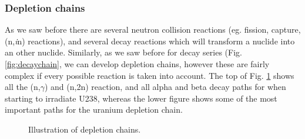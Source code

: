 \subsubsection{Depletion chains}

As we saw before there are several neutron collision reactions (eg. fission, capture, (n,\textit{i}n) reactions), and several decay reactions which will transform a nuclide into an other nuclide. Similarly, as we saw before for decay series (Fig. \ref{fig:decaychain}, we can develop depletion chains, however these are fairly complex if every possible reaction is taken into account. The top of Fig. \ref{fig:depletionchain} shows all the (n,$\gamma$) and (n,2n) reaction, and all alpha and beta decay paths for when starting to irradiate U238, whereas the lower figure shows some of the most important paths for the uranium depletion chain.

\begin{figure}[ht!]
\protect {}\protect
\caption{\label{fig:depletionchain} \footnotesize{Illustration of depletion chains.}}
\end{figure}

